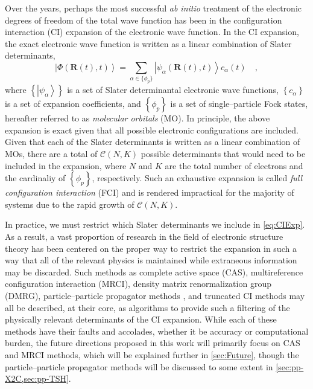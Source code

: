 \documentclass[12pt]{article}
\newcommand{\ket}[1]{\left\vert #1 \right\rangle}         %
\newcommand*\vc[1]{\boldsymbol{#1}}
\begin{document}
Over the years, perhaps the most successful \emph{ab initio} treatment of the
electronic degrees of freedom of the total wave function has been in the
configuration interaction (CI) expansion of the electronic wave function. In the
CI expansion, the exact electronic wave function is written as a linear
combination of Slater determinants,
\begin{equation}
\ket{\Phi (\vc{R}(t),t)} = \sum_{\alpha \in \{\phi_p \}}  
  \ket{\psi_\alpha (\vc{R}(t),t)} c_\alpha(t)
\quad ,
\label{eq:CIExp}
\end{equation}
where $\left\lbrace\ket{\psi_\alpha}\right\rbrace$ is a set of Slater
determinantal electronic wave functions, $\left\lbrace c_\alpha \right\rbrace$
is a set of expansion coefficients, and $\left\lbrace \phi_p \right\rbrace$ is a
set of single--particle Fock states, hereafter referred to as \emph{molecular
orbitals} (MO).  In principle, the above expansion is exact given that all
possible electronic configurations are included. Given that each of the Slater
determinants is written as a linear combination of MOs, there are a total of
$\mathcal{C}(N,K)$ possible determinants that would need to be included in the
expansion, where $N$ and $K$ are the total number of electrons and the
cardinaliy of $\left\lbrace \phi_p \right\rbrace$, respectively. Such an
exhaustive expansion is called \emph{full configuration interaction} (FCI) and
is rendered impractical for the majority of systems due to the rapid growth of
$\mathcal{C}(N,K)$.

In practice, we  must restrict which Slater determinants we include in
\cref{eq:CIExp}. As a result, a vast proportion of research in the field of
electronic structure theory has been centered on the proper way to restrict the
expansion in such a way that all of the relevant physics is maintained while
extraneous information may be discarded. Such methods as complete active space
(CAS), multireference configuration interaction (MRCI), density matrix
renormalization group (DMRG), particle--particle propagator methods , and
truncated CI methods may all be described, at their core, as algorithms to
provide such a filtering of the physically relevant determinants of the CI
expansion. While each of these methods have their faults and accolades, whether
it be accuracy or computational burden, the future directions proposed in this
work will primarily focus on CAS and MRCI methods, which will be explained
further in \cref{sec:Future}, though the particle--particle propagator methods
will be discussed to some extent in \cref{sec:pp-X2C,sec:pp-TSH}.
\end{document}
